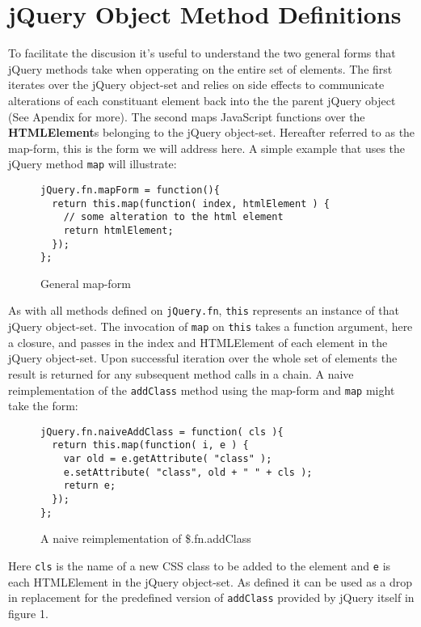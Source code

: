 \documentclass[preprint]{sigplanconf}
\begin{document}
\section{jQuery Object Method Definitions}

To facilitate the discusion it's useful to understand the two general forms that jQuery methods take when opperating on the entire set of elements. The first iterates over the jQuery object-set and relies on side effects to communicate alterations of each constituant element back into the the parent jQuery object (See Apendix for more). The second maps JavaScript functions over the \textbf{HTMLElement}s belonging to the jQuery object-set. Hereafter referred to as the map-form, this is the form we will address here. A simple example that uses the jQuery method \verb|map| will illustrate:

\begin{figure}[h!]
\begin{verbatim}
jQuery.fn.mapForm = function(){
  return this.map(function( index, htmlElement ) {
    // some alteration to the html element
    return htmlElement;
  });
};
\end{verbatim}
\caption{General map-form}
\end{figure}

As with all methods defined on \verb|jQuery.fn|, \verb|this| represents an instance of that jQuery object-set. The invocation of \verb|map| on \verb|this| takes a function argument, here a closure, and passes in the index and HTMLElement of each element in the jQuery object-set. Upon successful iteration over the whole set of elements the result is returned for any subsequent method calls in a chain. A naive reimplementation of the \verb|addClass| method using the map-form and \verb|map| might take the form:

\begin{figure}[h!]
\begin{verbatim}
jQuery.fn.naiveAddClass = function( cls ){
  return this.map(function( i, e ) {
    var old = e.getAttribute( "class" );
    e.setAttribute( "class", old + " " + cls );
    return e;
  });
};
\end{verbatim}
\caption{A naive reimplementation of \$.fn.addClass}
\end{figure}

Here \verb|cls| is the name of a new CSS class to be added to the element and \verb|e| is each HTMLElement in the jQuery object-set. As defined it can be used as a drop in replacement for the predefined version of \verb|addClass| provided by jQuery itself in figure 1.
\end{document}
